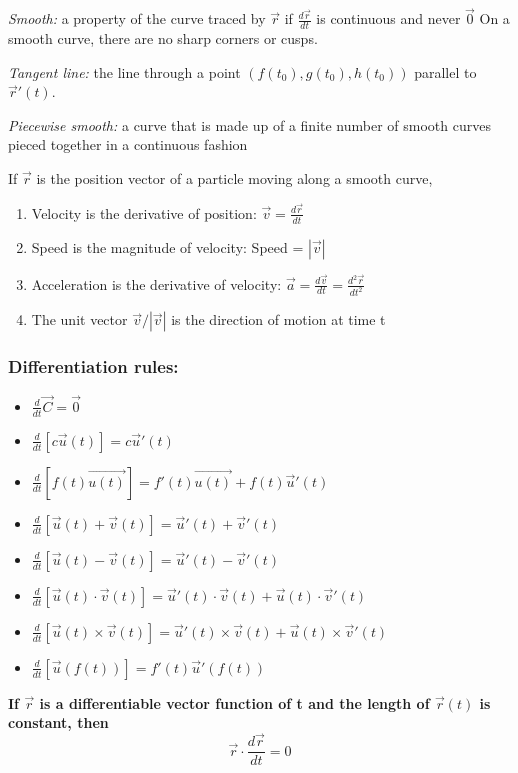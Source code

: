\documentclass[12pt]{article}
\begin{document}
\emph{Smooth:} a property of the curve traced by $\vec{r}$ if $\frac{d\vec{r}}{dt}$ is continuous and never $\vec{0}$ 
On a smooth curve, there are no sharp corners or cusps. 

\emph{Tangent line:} the line through a point $(f(t_0), g(t_0), h(t_0))$ parallel to $\vec{r}'(t)$. 

\emph{Piecewise smooth:} a curve that is made up of a finite number of smooth curves pieced together in a continuous fashion

If $\vec{r}$ is the position vector of a particle moving along a smooth curve,
\begin{enumerate}
    \item Velocity is the derivative of position: \quad $\vec{v} = \frac{d\vec{r}}{dt}$
    \item Speed is the magnitude of velocity: \quad Speed = $|\vec{v}|$
    \item Acceleration is the derivative of velocity: \quad $\vec{a} = \frac{d\vec{v}}{dt} = \frac{d^2 \vec{r}}{dt^2}$
    \item The unit vector $\vec{v} / |\vec{v}|$ is the direction of motion at time t
\end{enumerate}

\subsubsection{Differentiation rules:}
\begin{itemize}
    \item $\frac{d}{dt} \vec{C} = \vec{0}$
    \item $\frac{d}{dt} [c \vec{u}(t)] = c \vec{u}'(t)$
    \item $\frac{d}{dt} [f(t) \vec{u(t)}] = f'(t) \vec{u(t)} + f(t)\vec{u}'(t)$
    \item $\frac{d}{dt} [\vec{u}(t) + \vec{v}(t)] = \vec{u}'(t) + \vec{v}'(t)$
    \item $\frac{d}{dt} [\vec{u}(t) - \vec{v}(t)] = \vec{u}'(t) - \vec{v}'(t)$
    \item $\frac{d}{dt} [\vec{u}(t) \cdot \vec{v}(t)] = \vec{u}'(t) \cdot \vec{v}(t) + \vec{u}(t) \cdot \vec{v}'(t)$
    \item $\frac{d}{dt} [\vec{u}(t) \times \vec{v}(t)] = \vec{u}'(t) \times \vec{v}(t) + \vec{u}(t) \times \vec{v}'(t)$
    \item $\frac{d}{dt} [\vec{u} (f(t))] = f'(t) \vec{u}'(f(t))$
\end{itemize}

\textbf{If $\vec{r}$ is a differentiable vector function of t and the length of $\vec{r}(t)$ is constant, then}
\[\vec{r} \cdot \frac{d\vec{r}}{dt} = 0\]
\end{document}
